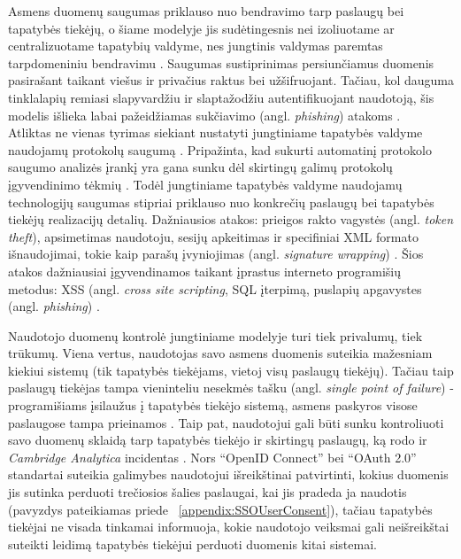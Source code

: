 Asmens duomenų saugumas priklauso nuo
bendravimo tarp paslaugų bei tapatybės tiekėjų, o šiame modelyje jis sudėtingesnis nei izoliuotame ar centralizuotame
tapatybių valdyme, nes jungtinis valdymas paremtas tarpdomeniniu bendravimu \cite{Maler2008}. Saugumas sustiprinimas persiunčiamus
duomenis pasirašant taikant viešus ir privačius raktus bei užšifruojant. Tačiau, kol dauguma tinklalapių remiasi slapyvardžiu ir slaptažodžiu autentifikuojant naudotoją,
šis modelis išlieka labai pažeidžiamas sukčiavimo (angl. \textit{phishing}) atakoms \cite{Maler2008}.\\
Atliktas ne vienas tyrimas siekiant nustatyti jungtiniame tapatybės valdyme naudojamų protokolų saugumą \cite{SAMLSecurity, OAuthSecurity, OIDCSecurity}. Pripažinta, kad
sukurti automatinį protokolo saugumo analizės įrankį yra gana sunku dėl skirtingų galimų protokolų įgyvendinimo tėkmių \cite{OIDCSecurity}. Todėl jungtiniame tapatybės valdyme
naudojamų technologijų saugumas stipriai priklauso nuo konkrečių paslaugų bei tapatybės tiekėjų realizacijų detalių. Dažniausios atakos: prieigos rakto vagystės (angl. \textit{token theft}),
 apsimetimas naudotoju, sesijų apkeitimas ir specifiniai XML formato išnaudojimai, tokie kaip parašų įvyniojimas (angl. \textit{signature wrapping}) \cite{SAMLSecurity, OAuthSecurity, OIDCSecurity}.
 Šios atakos dažniausiai įgyvendinamos taikant įprastus interneto programišių metodus: XSS (angl. \textit{cross site scripting}, SQL įterpimą, puslapių apgavystes (angl. \textit{phishing}) \cite{OIDCSecurity}.

Naudotojo duomenų kontrolė jungtiniame 
modelyje turi tiek privalumų, tiek trūkumų. Viena vertus, naudotojas savo asmens duomenis suteikia mažesniam kiekiui sistemų (tik tapatybės tiekėjams,
vietoj visų paslaugų tiekėjų). Tačiau taip paslaugų tiekėjas tampa vieninteliu nesekmės tašku (angl. \textit{single point of failure}) - programišiams įsilaužus
į tapatybės tiekėjo sistemą, asmens paskyros visose paslaugose tampa prieinamos \cite{Pashalidis2003}. Taip pat, naudotojui gali būti sunku kontroliuoti
savo duomenų sklaidą tarp tapatybės tiekėjo ir skirtingų paslaugų, ką rodo ir \textit{Cambridge Analytica} incidentas \cite{CambridgeAnalytica}. Nors \enquote{OpenID Connect} bei \enquote{OAuth 2.0}
standartai suteikia galimybes naudotojui išreikštinai patvirtinti, kokius duomenis jis sutinka perduoti trečiosios šalies paslaugai, kai
jis pradeda ja naudotis (pavyzdys pateikiamas priede \hypertarget{appendix:SSOUserConsent}{~\ref{appendix:SSOUserConsent}}), tačiau tapatybės tiekėjai ne visada tinkamai informuoja,
kokie naudotojo veiksmai gali neišreikštai suteikti leidimą tapatybės tiekėjui perduoti duomenis kitai sistemai.


